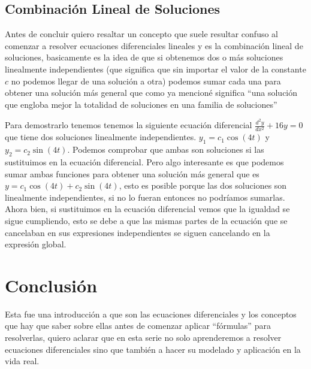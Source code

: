 \documentclass[12pt, letterpaper]{article}
\begin{document}
        \subsection{Combinación Lineal de Soluciones}
            \noindent
                Antes de concluir quiero resaltar un concepto que suele resultar confuso al comenzar a resolver ecuaciones diferenciales lineales y es la combinación lineal de soluciones, basicamente es la idea de que si obtenemos dos o más soluciones linealmente independientes (que significa que sin importar el valor de la constante $c$ no podemos llegar de una solución a otra) podemos sumar cada una para obtener una solución más general que como ya mencioné significa ``una solución que engloba mejor la totalidad de soluciones en una familia de soluciones''
            \par
                Para demostrarlo tenemos tenemos la siguiente ecuación diferencial $\frac{d^2y}{dx^2}+16y=0$ que tiene dos soluciones linealmente independientes. $y_1=c_1\cos(4t)$ y $y_2=c_2\sin(4t)$. Podemos comprobar que ambas son soluciones si las sustituimos en la ecuación diferencial. Pero algo interesante es que podemos sumar ambas funciones para obtener una solución más general que es $y=c_1\cos(4t)+c_2\sin(4t)$, esto es posible porque las dos soluciones son linealmente independientes, si no lo fueran entonces no podríamos sumarlas. Ahora bien, si sustituimos en la ecuación diferencial vemos que la igualdad se sigue cumpliendo, esto se debe a que las mismas partes de la ecuación que se cancelaban en sus expresiones independientes se siguen cancelando en la expresión global.
    \section{Conclusión}
        \noindent
            Esta fue una introducción a que son las ecuaciones diferenciales y los conceptos que hay que saber sobre ellas antes de comenzar aplicar ``fórmulas'' para resolverlas, quiero aclarar que en esta serie no solo aprenderemos a resolver ecuaciones diferenciales sino que también a hacer su modelado y aplicación en la vida real.
\end{document}

